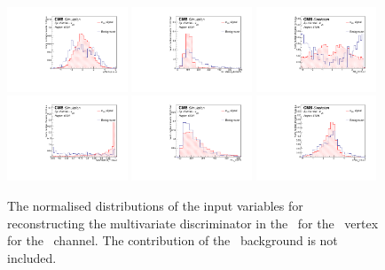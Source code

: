 \begin{figure}[htbp]
	\centering
	\includegraphics[width=0.32\textwidth]{6_Search/Figures/PlotsTechnics/SMtopetaZctsingletopuuu_norm}
	\includegraphics[width=0.32\textwidth]{6_Search/Figures/PlotsTechnics/mlbZctsingletopuuu_norm}
	\includegraphics[width=0.32\textwidth]{6_Search/Figures/PlotsTechnics/dPhiWlepbZctsingletopuuu_norm}
	\includegraphics[width=0.32\textwidth]{6_Search/Figures/PlotsTechnics/bdiscCSVv2_jet_0Zctsingletopuuu_norm}	\includegraphics[width=0.32\textwidth]{6_Search/Figures/PlotsTechnics/TotalInvMass_lepZctsingletopuuu_norm}
	\includegraphics[width=0.32\textwidth]{6_Search/Figures/PlotsTechnics/dRZWlepZctsingletopuuu_norm}
	\caption{The normalised distributions of the input variables for reconstructing the multivariate discriminator in the \STSR\ for the \Zct\ vertex for the \mumumu\ channel. The contribution of the \NPL\ background is not included. }
	\label{fig:singletopZctnormalized}
\end{figure}


